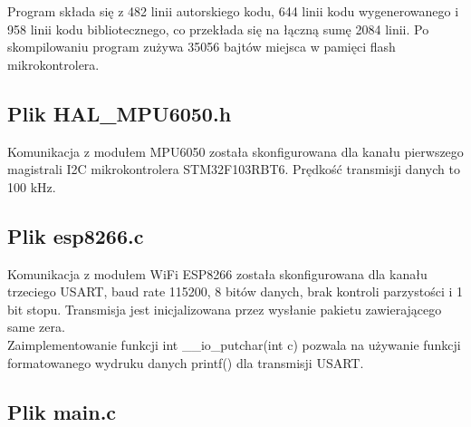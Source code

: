 \documentclass[a4paper,12pt,twoside,openany]{report}
\begin{document}
Program składa się z 482 linii autorskiego kodu, 644 linii kodu wygenerowanego i 958 linii kodu bibliotecznego, co przekłada się na łączną sumę 2084 linii. Po skompilowaniu program zużywa 35056 bajtów miejsca w pamięci flash mikrokontrolera.

\subsection{Plik HAL\_MPU6050.h}

Komunikacja z modułem MPU6050 została skonfigurowana dla kanału pierwszego magistrali I2C mikrokontrolera STM32F103RBT6. Prędkość transmisji danych to 100 kHz.

\subsection{Plik esp8266.c}

Komunikacja z modułem WiFi ESP8266 została skonfigurowana dla kanału trzeciego USART, baud rate 115200, 8 bitów danych, brak kontroli parzystości i 1 bit stopu. Transmisja jest inicjalizowana przez wysłanie pakietu zawierającego same zera.\\
Zaimplementowanie funkcji int \_\_io\_putchar(int c) pozwala na używanie funkcji formatowanego wydruku danych printf() dla transmisji USART.

\subsection{Plik main.c}
\end{document}

